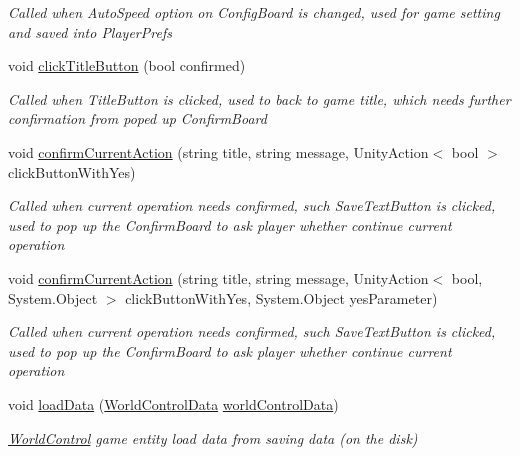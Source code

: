 \begin{DoxyCompactItemize}
\begin{DoxyCompactList}\small\item\em Called when Auto\+Speed option on Config\+Board is changed, used for game setting and saved into Player\+Prefs \end{DoxyCompactList}\item 
void \hyperlink{class_world_control_a99c9c36c15d02586510c73bad7b35fe3}{click\+Title\+Button} (bool confirmed)
\begin{DoxyCompactList}\small\item\em Called when Title\+Button is clicked, used to back to game title, which needs further confirmation from poped up Confirm\+Board \end{DoxyCompactList}\item 
void \hyperlink{class_world_control_ae37c3979deafb06e06db4e37e3a89874}{confirm\+Current\+Action} (string title, string message, Unity\+Action$<$ bool $>$ click\+Button\+With\+Yes)
\begin{DoxyCompactList}\small\item\em Called when current operation needs confirmed, such Save\+Text\+Button is clicked, used to pop up the Confirm\+Board to ask player whether continue current operation \end{DoxyCompactList}\item 
void \hyperlink{class_world_control_a701a10f2ca9662f666c0e6bef6cc7d60}{confirm\+Current\+Action} (string title, string message, Unity\+Action$<$ bool, System.\+Object $>$ click\+Button\+With\+Yes, System.\+Object yes\+Parameter)
\begin{DoxyCompactList}\small\item\em Called when current operation needs confirmed, such Save\+Text\+Button is clicked, used to pop up the Confirm\+Board to ask player whether continue current operation \end{DoxyCompactList}\item 
void \hyperlink{class_world_control_a4b2c1ba84e78978ea05fb09b862f9df5}{load\+Data} (\hyperlink{class_world_control_data}{World\+Control\+Data} \hyperlink{class_world_control_a61aa6f540da8869b1b1dc8af6adead26}{world\+Control\+Data})
\begin{DoxyCompactList}\small\item\em \hyperlink{class_world_control}{World\+Control} game entity load data from saving data (on the disk) \end{DoxyCompactList}\end{DoxyCompactItemize}
